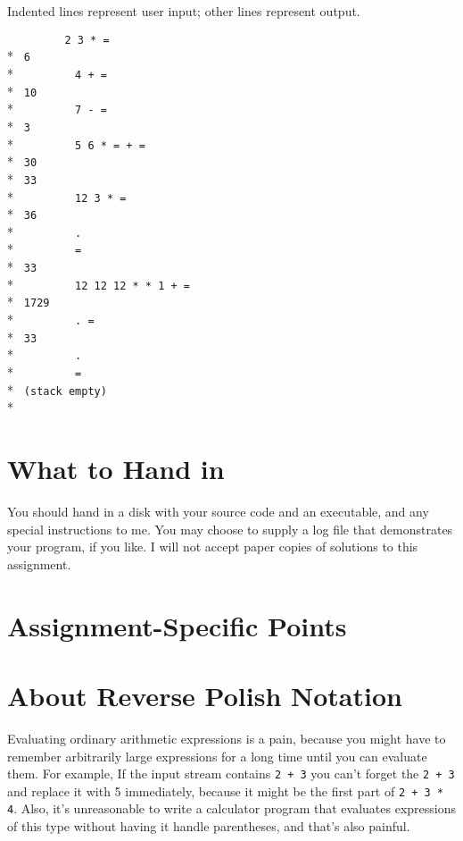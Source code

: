 Indented lines represent user input; other lines represent output.
\begin{flushleft}
\verb!         2 3 * =! \\*
\verb! 6! \\*
\verb!         4 + = ! \\*
\verb! 10 ! \\*
\verb!         7 - = ! \\*
\verb! 3 ! \\*
\verb!         5 6 * = + = ! \\*
\verb! 30! \\*
\verb! 33! \\*
\verb!         12 3 * = ! \\*
\verb! 36 ! \\*
\verb!         .! \\*
\verb!         =! \\*
\verb! 33 ! \\*
\verb!         12 12 12 * * 1 + = ! \\*
\verb! 1729 ! \\*
\verb!         . =  ! \\*
\verb! 33 ! \\*
\verb!         .! \\*
\verb!         =! \\*
\verb! (stack empty)! \\*
\end{flushleft}

\section{What to Hand in}

You should hand in a disk with your source code and an executable, and
any special instructions to me.  You may choose to supply a log file
that demonstrates your program, if you like.  I will not accept paper
copies of solutions to this assignment.

\section{Assignment-Specific Points}


\section{About Reverse Polish Notation}
\label{rpn}

Evaluating ordinary arithmetic expressions is a pain, because you might
have to remember arbitrarily large expressions for a long time until you
can evaluate them.  For example, If the input stream contains {\tt 2 +
3} you can't forget the {\tt 2 + 3} and replace it with 5 immediately,
because it might be the first part of {\tt 2 + 3 * 4}.  Also, it's
unreasonable to write a calculator program that evaluates expressions of
this type without having it handle parentheses, and that's also painful.

